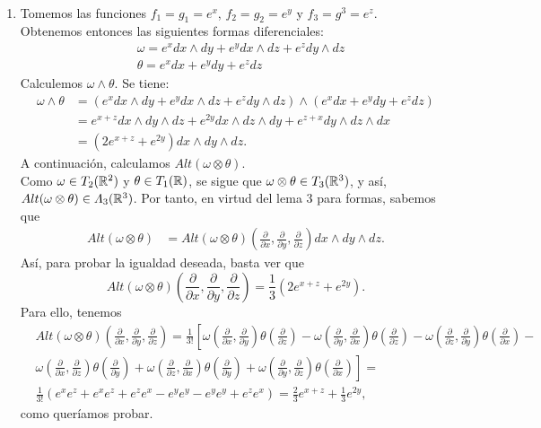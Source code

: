 \documentclass[twoside]{article}
\newcommand{\V}{\wedge}
\newcommand{\parcial}[2]{\frac{\partial #1}{\partial #2}}
\begin{document}
\begin{solucion}\
\begin{enumerate}
\item Tomemos las funciones $f_1 = g_1 = e^x$, $f_2 = g_2 = e^y$ y $f_3 = g^3 = e^z$. \\
Obtenemos entonces las siguientes formas diferenciales: \begin{equation*}
\begin{split}
	 & \omega = e^x dx \V dy + e^y dx \V dz + e^z dy\V dz \\
	 & \theta = e^x dx + e^y dy + e^z dz
	\end{split}
\end{equation*}
Calculemos $\omega \V \theta.$ Se tiene: \begin{equation*}
\begin{split}
\omega \V \theta & = (e^x dx \V dy + e^y dx \V dz + e^z dy\V dz) \V ( e^x dx + e^y dy + e^z dz) \\ & = e^{x+z} dx \V dy \V dz + e^{2y} dx \V dz \V dy + e^{z+x} dy\V dz \V dx \\ & = (2e^{x+z} + e^{2y})dx \V dy \V dz.
\end{split}
\end{equation*}
A continuación, calculamos $Alt (\omega \otimes \theta).$ \\
Como $\omega \in T_2(\mathcal{\mathbb{R}}^2)$ y $\theta \in T_1(\mathcal{\mathbb{R}})$, se sigue que  $\omega \otimes \theta \in T_3(\mathcal{\mathbb{R}}^3)$, y así, $ Alt (\omega \otimes \theta) \in \varLambda_3(\mathcal{\mathbb{R}}^3)$. Por tanto, en virtud del  lema 3 para formas, sabemos que \begin{equation*}
\begin{split}
Alt(\omega \otimes \theta) & = Alt (\omega \otimes \theta)\left(\parcial{}{x},\parcial{}{y},\parcial{}{z}\right) dx \V dy \V dz.
\end{split}
\end{equation*}
Así, para probar la igualdad deseada, basta ver que \begin{equation*}
 Alt (\omega \otimes \theta) \left(\parcial{}{x},\parcial{}{y},\parcial{}{z}\right) = \frac{1}{3} (2e^{x+z} + e^{2y}).
\end{equation*}
Para ello, tenemos \begin{equation*}
\begin{split}
 & Alt (\omega \otimes \theta) \left(\parcial{}{x},\parcial{}{y},\parcial{}{z}\right)  =  \frac{1}{3!}\left[ ω\left(\parcial{}{x},\parcial{}{y}\right)θ\left(\parcial{}{z}\right)-ω\left(\parcial{}{y},\parcial{}{x}\right)θ\left(\parcial{}{z}\right)-ω\left(\parcial{}{z},\parcial{}{y}\right)θ\left(\parcial{}{x}\right)-\right.\\
&\left.ω\left(\parcial{}{x},\parcial{}{z}\right)θ\left(\parcial{}{y}\right)+ω\left(\parcial{}{z},\parcial{}{x}\right)θ\left(\parcial{}{y}\right)+ω\left(\parcial{}{y},\parcial{}{z}\right)θ\left(\parcial{}{x}\right)\right]=\\ 
& \frac{1}{3!} \left(e^xe^z + e^xe^z +e^ze^x - e^ye^y - e^ye^y +   e^ze^x    \right) = \frac{2}{3}e^{x+z} + \frac{1}{3}e^{2y},
\end{split}
\end{equation*} 
como queríamos probar.


\end{enumerate}
\end{solucion}
\end{document}
